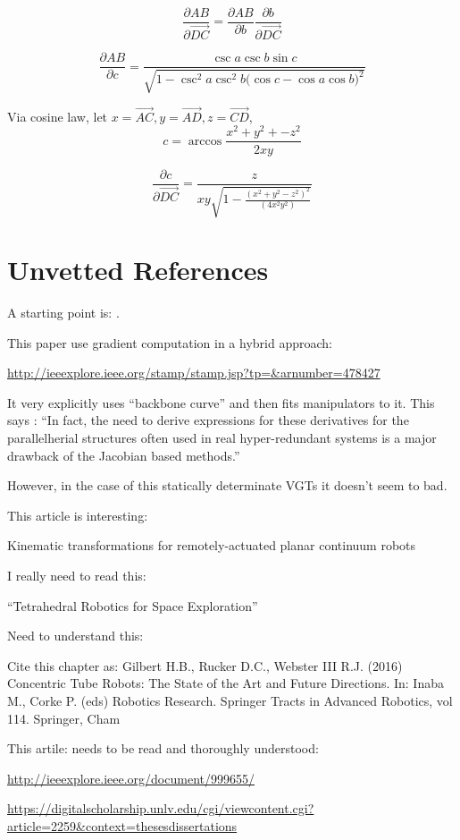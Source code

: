 \documentclass[11pt]{article}
\begin{document}
\[
\frac{\partial AB }{\partial \overrightarrow{DC}}   =  \frac{\partial AB }{\partial b} \frac{\partial b}{\partial \overrightarrow{DC}} 
\]

\[
\frac{\partial AB }{\partial c} =
\frac{\csc{a} \csc{b} \sin{c}}
 {\sqrt{1 - \csc^2{a} \csc^2{b} \big( \cos{c} - \cos{a} \cos{b}\big)^2}}
\]

Via cosine law, let $x = \overrightarrow{AC}, y = \overrightarrow{AD}, z = \overrightarrow{CD}$,
\[
c = \arccos{\frac{x^2 + y^2 + -z^2}{2xy}}
\]

\[
\frac{\partial c}{\partial \overrightarrow{DC}} = \frac{z}{x y \sqrt{1 -
    \frac{(x^2 + y^2 - z^2)^2}{(4 x^2 y^2)}}}
\]

\section{Unvetted References}

A starting point is: \cite{Hanahara2008}.

This paper use gradient computation in a hybrid approach:

\url{http://ieeexplore.ieee.org/stamp/stamp.jsp?tp=&arnumber=478427}

It very explicitly uses ``backbone curve'' and then fits manipulators to it.
This says :  ``In fact, the need to derive expressions for these
derivatives for the parallelherial structures often used in real
hyper-redundant systems is a major drawback of the Jacobian
based methods.''

However, in the case of this statically determinate VGTs it doesn't seem to bad.

This article is interesting:

Kinematic transformations for remotely-actuated planar continuum robots

I really need to read this:

``Tetrahedral Robotics for Space Exploration''

Need to understand this:

Cite this chapter as:
Gilbert H.B., Rucker D.C., Webster III R.J. (2016) Concentric Tube Robots: The State of the Art and Future Directions. In: Inaba M., Corke P. (eds) Robotics Research. Springer Tracts in Advanced Robotics, vol 114. Springer, Cham

This artile: needs to be read and thoroughly understood:

\url{http://ieeexplore.ieee.org/document/999655/}

\url{https://digitalscholarship.unlv.edu/cgi/viewcontent.cgi?article=2259&context=thesesdissertations}



\end{document}
